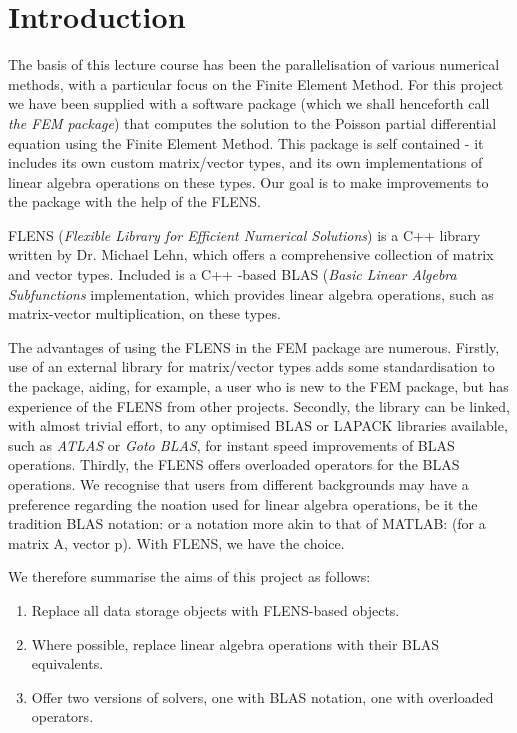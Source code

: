 
\section{Introduction}

The basis of this lecture course has been the parallelisation of various numerical methods, with a particular focus on the Finite Element Method. For this project we have been supplied with a software package (which we shall henceforth call \emph{the FEM package}) that computes the solution to the Poisson partial differential equation using the Finite Element Method. This package is self contained - it includes its own custom matrix/vector types, and its own implementations of linear algebra operations on these types. Our goal is to make improvements to the package with the help of the FLENS.

FLENS (\emph{Flexible Library for Efficient Numerical Solutions}) is a C++ library written by Dr. Michael Lehn, which offers a comprehensive collection of matrix and vector types. Included is a C++ -based BLAS (\emph{Basic Linear Algebra Subfunctions} implementation, which provides linear algebra operations, such as matrix-vector multiplication, on these types. 

The advantages of using the FLENS in the FEM package are numerous. Firstly, use of an external library for matrix/vector types adds some standardisation to the package, aiding, for example, a user who is new to the FEM package, but has experience of the FLENS from other projects. Secondly, the library can be linked, with almost trivial effort, to any optimised BLAS or LAPACK libraries available, such as \emph{ATLAS} or \emph{Goto BLAS}, for instant speed improvements of BLAS operations. Thirdly, the FLENS offers overloaded operators for the BLAS operations. We recognise that users from different backgrounds may have a preference regarding the noation used for linear algebra operations, be it the tradition BLAS notation:
or a notation more akin to that of MATLAB:
(for a matrix A, vector p). With FLENS, we have the choice.

We therefore summarise the aims of this project as follows:
\begin{enumerate}
   \item Replace all data storage objects with FLENS-based objects.
   \item Where possible, replace linear algebra operations with their BLAS equivalents.
   \item Offer two versions of solvers, one with BLAS notation, one with overloaded operators.
\end{enumerate}

